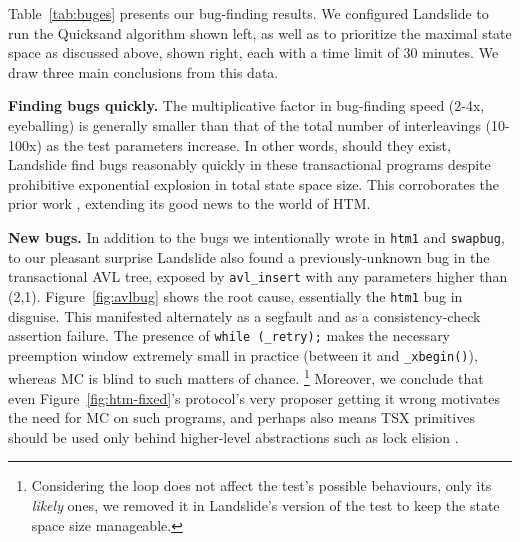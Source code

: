 \documentclass[10pt]{sigplanconf}
\begin{document}
Table~\ref{tab:buges}
presents our bug-finding results.
We configured Landslide to run the Quicksand algorithm \cite{quicksand}
shown left,
as well as to prioritize the maximal state space as discussed above,
shown right,
each with a time limit of 30 minutes.
We draw three main conclusions from this data.

		{\bf Finding bugs quickly.}
		The multiplicative factor in bug-finding speed (2-4x, eyeballing) is generally smaller
		than that of the total number of interleavings (10-100x)
		as the test parameters increase.
		In other words,
		should they exist,
		Landslide find bugs reasonably quickly in these transactional programs
		despite prohibitive exponential explosion in total state space size.
		This corroborates the prior work \cite{quicksand},
		extending its good news to the world of HTM.

		{\bf New bugs.}
		In addition to the bugs we intentionally wrote in {\tt htm1} and {\tt swapbug},
		to our pleasant surprise
		Landslide also found a previously-unknown bug in the transactional AVL tree,
		exposed by {\tt avl\_insert} with any parameters higher than (2,1).
		Figure~\ref{fig:avlbug} shows the root cause, essentially the {\tt htm1} bug in disguise.
		This manifested
		alternately
		as a segfault
		and
		as a consistency-check assertion failure.
		The presence of {\tt while (\_retry);} makes the necessary preemption window extremely small
		in practice (between it and {\tt \_xbegin()}),
		whereas MC is blind to such matters of chance.%
		\footnote{Considering the loop does not affect the test's possible behaviours,
		only its {\em likely} ones,
		we removed it in Landslide's version of the test to keep the state space size manageable.}
		Moreover, we conclude that even Figure~\ref{fig:htm-fixed}'s protocol's very proposer %
		getting it wrong motivates the need for MC on such programs,
		and perhaps also means TSX primitives should be used only behind higher-level abstractions
		such as lock elision \cite{lock-elision}.
\end{document}
